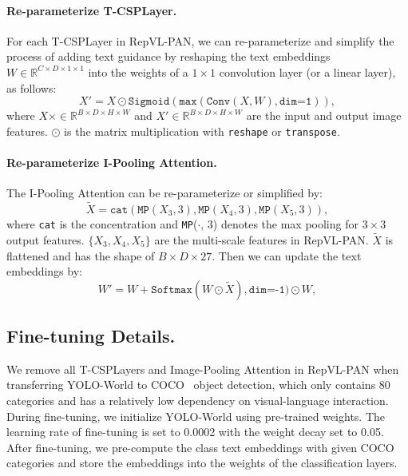 \documentclass[10pt,twocolumn,letterpaper]{article}
\newcommand{\name}{YOLO-World}
\begin{document}
\paragraph{Re-parameterize T-CSPLayer.}
For each T-CSPLayer in RepVL-PAN, we can re-parameterize and simplify the process of adding text guidance by reshaping the text embeddings $W\in \mathbb{R}^{C\times D\times1\times1}$ into the weights of a $1\times1$ convolution layer (or a linear layer), as follows:
\begin{equation}
    X' = X \odot \texttt{Sigmoid}(\texttt{max}(\texttt{Conv}(X, W), \texttt{dim=1})),
\end{equation}
where $X\times \in \mathbb{R}^{B\times D\times H\times W}$ and $X'\in \mathbb{R}^{B\times D\times H\times W}$ are the input and output image features. $\odot$ is the matrix multiplication with \texttt{reshape} or \texttt{transpose}.


\paragraph{Re-parameterize I-Pooling Attention.}
The I-Pooling Attention can be re-parameterize or simplified by:
\begin{equation}
    \tilde{X} = \texttt{cat}(\texttt{MP}(X_3, 3),\texttt{MP}(X_4, 3), \texttt{MP}(X_5, 3)),
\end{equation}
where \texttt{cat} is the concentration and \texttt{MP}($\cdot$, 3) denotes the max pooling for $3\times3$ output features. $\{X_3, X_4, X_5\}$ are the multi-scale features in RepVL-PAN.
$\tilde{X}$ is flattened and has the shape of $B\times D\times27$.
Then we can update the text embeddings by:
\begin{equation}
    W' = W + \texttt{Softmax}(W\odot\tilde{X}), \texttt{dim=-1}) \odot W,
\end{equation}


\subsection{Fine-tuning Details.}
We remove all T-CSPLayers and Image-Pooling Attention in RepVL-PAN when transferring \name{} to COCO~\cite{COCO} object detection, which only contains 80 categories and has a relatively low dependency on visual-language interaction.
During fine-tuning, we initialize \name{} using pre-trained weights.
The learning rate of fine-tuning is set to 0.0002 with the weight decay set to 0.05.
After fine-tuning, we pre-compute the class text embeddings with given COCO categories and store the embeddings into the weights of the classification layers.
\end{document}

